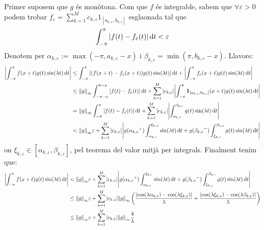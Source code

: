 \documentclass[10pt,a4paper]{article}
\newcommand{\vf}[1]{\boldsymbol{\mathrm{#1}}} %
\theoremstyle{definition}
\begin{document}
\begin{enumerate}
        Primer suposem que $g$ és monòtona. Com que $f$ és integrable, sabem que $\forall \varepsilon >0$ podem trobar $f_{\varepsilon}=\sum_{k=1}^Mc_{k,\varepsilon}\vf{1}_{[a_{k,\varepsilon},b_{k,\varepsilon}]}$ esglaonada tal que $$\int_{-\pi}^{\pi}\abs{f(t)-f_{\varepsilon}(t)}\dd{t}<\varepsilon$$ Denotem per $\alpha_{k,\varepsilon}:=\max(-\pi,a_{k,\varepsilon}-x)$ i $\beta_{k,\varepsilon}=\min(\pi,b_{k,\varepsilon}-x)$. Llavors:
        \begin{align*}
          \abs{\int_{-\pi}^{\pi}f(x+t)g(t)\sin(\lambda t)\dd{t}} & \leq \int_{-\pi}^{\pi}\abs{(f(x+t)-f_{\varepsilon}(x+t))g(t)\sin(\lambda t)}\dd{t}+\abs{\int_{-\pi}^{\pi}f_{\varepsilon}(x+t)g(t)\sin(\lambda t)\dd{t}}                                                                                                                             \\
                                                                 & \leq \norm{g}_\infty\int_{-\pi-x}^{\pi-x}\abs{f(t)-f_{\varepsilon}(t)}\dd{t}+\sum_{k=1}^M\abs{c_{k,\varepsilon}}\abs{\int_{-\pi}^{\pi}\vf{1}_{[a_{k,\varepsilon},b_{k,\varepsilon}]}(x+t)g(t)\sin(\lambda t)\dd{t}}                                                                 \\
                                                                 & = \norm{g}_\infty\int_{-\pi}^{\pi}\abs{f(t)-f_{\varepsilon}(t)}\dd{t}+\sum_{k=1}^M\abs{c_{k,\varepsilon}}\abs{\int_{\alpha_{k,\varepsilon}}^{\beta_{k,\varepsilon}}g(t)\sin(\lambda t)\dd{t}}                                                                                       \\
                                                                 & < \norm{g}_\infty\varepsilon+\sum_{k=1}^M\abs{c_{k,\varepsilon}}\abs{g({\alpha_{k,\varepsilon}}^+)\int_{\alpha_{k,\varepsilon}}^{\xi_{k,\varepsilon}}\sin(\lambda t)\dd{t}+g({\beta_{k,\varepsilon}}^-)\int_{\xi_{k,\varepsilon}}^{\beta_{k,\varepsilon}}g(t)\sin(\lambda t)\dd{t}}
        \end{align*}
        on $\xi_{k,\varepsilon}\in[{\alpha_{k,\varepsilon}},{\beta_{k,\varepsilon}}]$, pel teorema del valor mitjà per integrals. Finalment tenim que:
        \begin{align*}
          \abs{\int_{-\pi}^{\pi}f(x+t)g(t)\sin(\lambda t)\dd{t}} & < \norm{g}_\infty\varepsilon+\sum_{k=1}^M\abs{c_{k,\varepsilon}}\abs{g({\alpha_{k,\varepsilon}}^+)\int_{\alpha_{k,\varepsilon}}^{\xi_{k,\varepsilon}}\sin(\lambda t)\dd{t}+g({\beta_{k,\varepsilon}}^-)\int_{\xi_{k,\varepsilon}}^{\beta_{k,\varepsilon}}g(t)\sin(\lambda t)\dd{t}}    \\
                                                                 & \leq \norm{g}_\infty\varepsilon+\sum_{k=1}^M\abs{c_{k,\varepsilon}}\norm{g}_\infty\left(\frac{\abs{\cos(\lambda \alpha_{k,\varepsilon})-\cos(\lambda\xi_{k,\varepsilon})}}{\lambda}+\frac{\abs{\cos(\lambda \xi_{k,\varepsilon})-\cos(\lambda \beta_{k,\varepsilon})}}{\lambda}\right) \\
                                                                 & \leq \norm{g}_\infty\varepsilon+\sum_{k=1}^M\abs{c_{k,\varepsilon}}\norm{g}_\infty\frac{4}{\lambda}
        \end{align*}


\end{enumerate}
\end{document}
